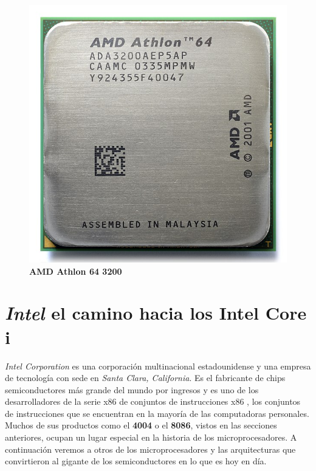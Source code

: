 \begin{figure}[htb]
	\centering
	\includegraphics[scale = 0.15]{Graphics/AMD_Athlon_64_3200+_ADA3200AEP5AP.jpg}
	\caption{\textbf{AMD Athlon 64 3200}}
	\label{fig:20}
\end{figure}

\section{\emph{Intel} el camino hacia los \textbf{Intel Core i}}
\emph{Intel Corporation} es una corporación multinacional estadounidense y una empresa de tecnología con sede en \emph{Santa Clara, California}. 
Es el fabricante de chips semiconductores más grande del mundo por ingresos y es uno de los desarrolladores de la serie x86 
de conjuntos de instrucciones x86 , los conjuntos de instrucciones que se encuentran en la mayoría de las 
computadoras personales. Muchos de sus productos como el \textbf{4004} o el \textbf{8086}, vistos en las secciones anteriores, ocupan un lugar especial 
en la historia de los microprocesadores. A continuación veremos a otros de los microprocesadores y las arquitecturas que convirtieron 
al gigante de los semiconductores en lo que es hoy en día.\

